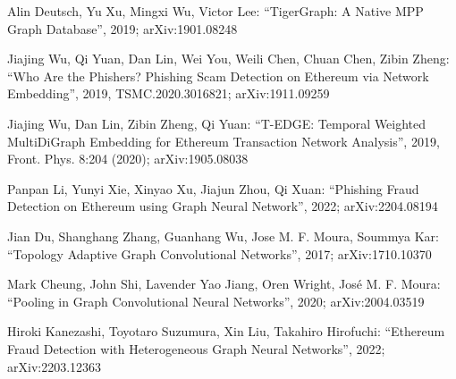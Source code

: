 \documentclass{article}
\begin{document}
\begin{thebibliography}{}
\bibitem{}
Alin Deutsch, Yu Xu, Mingxi Wu, Victor Lee: “TigerGraph: A Native MPP Graph Database”, 2019; arXiv:1901.08248

\bibitem{}
Jiajing Wu, Qi Yuan, Dan Lin, Wei You, Weili Chen, Chuan Chen, Zibin Zheng: “Who Are the Phishers? Phishing Scam Detection on Ethereum via Network Embedding”, 2019, TSMC.2020.3016821; arXiv:1911.09259

\bibitem{}
Jiajing Wu, Dan Lin, Zibin Zheng, Qi Yuan: “T-EDGE: Temporal Weighted MultiDiGraph Embedding for Ethereum Transaction Network Analysis”, 2019, Front. Phys. 8:204 (2020); arXiv:1905.08038

\bibitem{}
Panpan Li, Yunyi Xie, Xinyao Xu, Jiajun Zhou, Qi Xuan: “Phishing Fraud Detection on Ethereum using Graph Neural Network”, 2022; arXiv:2204.08194

\bibitem{}
Jian Du, Shanghang Zhang, Guanhang Wu, Jose M. F. Moura, Soummya Kar: “Topology Adaptive Graph Convolutional Networks”, 2017; arXiv:1710.10370

\bibitem{}
Mark Cheung, John Shi, Lavender Yao Jiang, Oren Wright, José M. F. Moura: “Pooling in Graph Convolutional Neural Networks”, 2020; arXiv:2004.03519

\bibitem{}
Hiroki Kanezashi, Toyotaro Suzumura, Xin Liu, Takahiro Hirofuchi: “Ethereum Fraud Detection with Heterogeneous Graph Neural Networks”, 2022; arXiv:2203.12363
\end{thebibliography}
\end{document}
